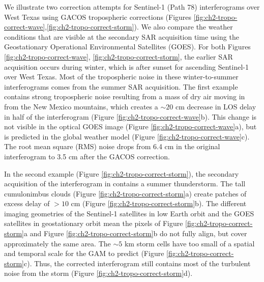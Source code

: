 We illustrate two correction attempts for Sentinel-1 (Path 78) interferograms over West Texas using GACOS tropospheric corrections (Figures \ref{fig:ch2-tropo-correct-wave},\ref{fig:ch2-tropo-correct-storm}). 
We also compare the weather conditions that are visible at the secondary SAR acquisition time using the Geostationary Operational Environmental Satellites (GOES).
For both Figures \ref{fig:ch2-tropo-correct-wave}, \ref{fig:ch2-tropo-correct-storm}, the earlier SAR acquisition occurs during winter, which is after sunset for ascending Sentinel-1 over West Texas. Most of the tropospheric noise in these winter-to-summer interferograms comes from the summer SAR acquisition.
The first example contains strong tropospheric noise resulting from a mass of dry air moving in from the New Mexico mountains, which creates a $\sim 20$ cm decrease in LOS delay in half of the interferogram (Figure \ref{fig:ch2-tropo-correct-wave}b). This change is not visible in the optical GOES image (Figure \ref{fig:ch2-tropo-correct-wave}a), but is predicted in the global weather model (Figure \ref{fig:ch2-tropo-correct-wave}c). 
The root mean square (RMS) noise drops from 6.4 cm in the original interferogram to 3.5 cm after the GACOS correction.

In the second example (Figure \ref{fig:ch2-tropo-correct-storm}), the secondary acquisition of the interferogram in contains a summer thunderstorm. The tall cumulonimbus clouds (Figure \ref{fig:ch2-tropo-correct-storm}a) create patches of excess delay of $>10$ cm (Figure \ref{fig:ch2-tropo-correct-storm}b).
The different imaging geometries of the Sentinel-1 satellites in low Earth orbit and the GOES satellites in geostationary orbit mean the pixels of Figure \ref{fig:ch2-tropo-correct-storm}a and Figure \ref{fig:ch2-tropo-correct-storm}b do not fully align, but cover approximately the same area.
The $\sim 5$ km storm cells have too small of a spatial and temporal scale for the GAM to predict (Figure \ref{fig:ch2-tropo-correct-storm}c). Thus, the corrected interferogram still contains most of the turbulent noise from the storm (Figure \ref{fig:ch2-tropo-correct-storm}d).


